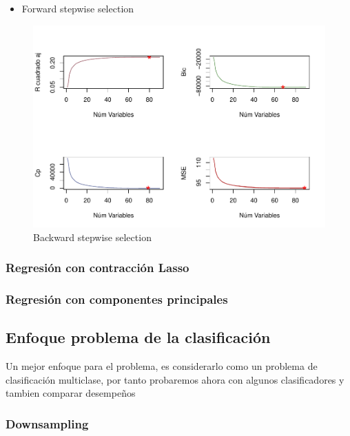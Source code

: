 \documentclass[conference,final,]{IEEEtran}
\providecommand{\tightlist}{%
  \setlength{\itemsep}{0pt}\setlength{\parskip}{0pt}}
\begin{document}
\begin{itemize}
\tightlist
\item
  Forward stepwise selection
\end{itemize}

\begin{figure}[H]

{\centering \includegraphics[width=0.6\linewidth]{YearPrediction_Reporte_files/figure-latex/unnamed-chunk-6-1} 

}

\caption{Backward stepwise selection}\label{fig:unnamed-chunk-6}
\end{figure}

\hypertarget{regresion-con-contraccion-lasso}{%
\subsubsection{Regresión con contracción
Lasso}\label{regresion-con-contraccion-lasso}}

\hypertarget{regresion-con-componentes-principales}{%
\subsubsection{Regresión con componentes
principales}\label{regresion-con-componentes-principales}}

\hypertarget{enfoque-problema-de-la-clasificacion}{%
\subsection{Enfoque problema de la
clasificación}\label{enfoque-problema-de-la-clasificacion}}

Un mejor enfoque para el problema, es considerarlo como un problema de
clasificación multiclase, por tanto probaremos ahora con algunos
clasificadores y tambien comparar desempeños

\hypertarget{downsampling}{%
\subsubsection{Downsampling}\label{downsampling}}
\end{document}
